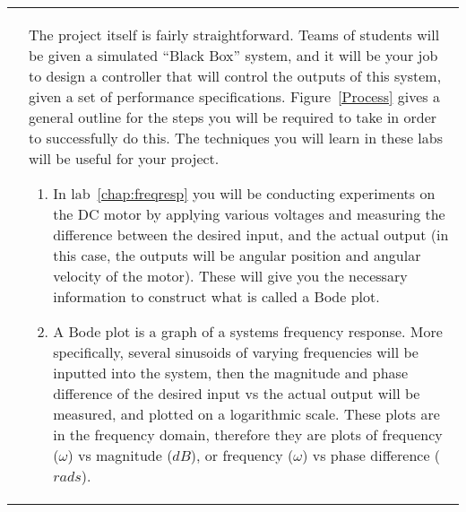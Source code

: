 \begin{tabular}{p{4cm} p{10cm}}
     & 
    \vspace{0pt}
    The project itself is fairly straightforward. Teams of students will 
    be given a simulated ``Black Box'' system, and it will be your job to design a 
    controller that will control the outputs of this system, given a set of performance 
    specifications. Figure~\ref{Process} gives a general outline for the 
    steps you will be required to take in order to successfully do this. The techniques 
    you will learn in these labs will be useful for your project. 
    \begin{enumerate}
        \item In lab~\ref{chap:freqresp} you will be conducting experiments on the DC motor by
              applying various voltages and measuring the difference between the desired input, and the 
              actual output (in this case, the outputs will be angular position and angular velocity of the motor). 
              These will give you the necessary information to construct what is called a Bode plot. 
        \item A Bode plot is a graph of a systems frequency response. More specifically, several sinusoids
              of varying frequencies will be inputted into the system, then the magnitude and phase difference 
              of the desired input vs the actual output will be measured, and plotted on a logarithmic scale. 
              These plots are in the frequency domain, therefore they are plots of frequency (\(\omega \)) 
              vs magnitude (\(dB\)), or frequency (\(\omega \)) vs phase difference (\(rads\)).
    \end{enumerate}
\end{tabular}
